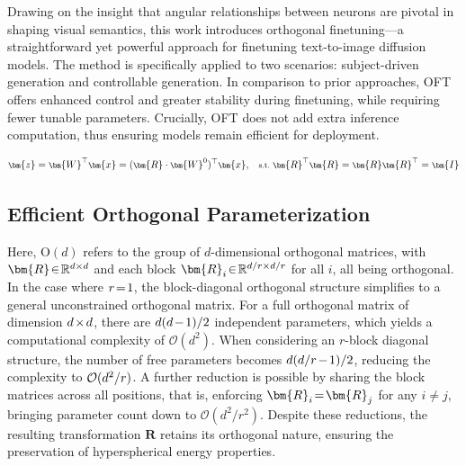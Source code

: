 Drawing on the insight that angular relationships between neurons are pivotal in shaping visual semantics, this work introduces orthogonal finetuning—a straightforward yet powerful approach for finetuning text-to-image diffusion models. The method is specifically applied to two scenarios: subject-driven generation and controllable generation. In comparison to prior approaches, OFT offers enhanced control and greater stability during finetuning, while requiring fewer tunable parameters. Crucially, OFT does not add extra inference computation, thus ensuring models remain efficient for deployment.

\begin{equation}\label{eq:oft_general}
    \footnotesize
    \bm{z}=\bm{W}^\top\bm{x}=(\bm{R}\cdot\bm{W}^0)^\top\bm{x},~~~\text{s.t.}~\bm{R}^\top\bm{R}=\bm{R}\bm{R}^\top=\bm{I}
\end{equation}

\subsection{Efficient Orthogonal Parameterization}\label{sect:eff_ortho}

Here, $\text{O}(d)$ refers to the group of $d$-dimensional orthogonal matrices, with $\thickmuskip=2mu \medmuskip=2mu \bm{R}\in\mathbb{R}^{d\times d}$ and each block $\thickmuskip=2mu \medmuskip=2mu \bm{R}_i\in\mathbb{R}^{d/r\times d/r}$ for all $i$, all being orthogonal. In the case where $\thickmuskip=2mu \medmuskip=2mu r=1$, the block-diagonal orthogonal structure simplifies to a general unconstrained orthogonal matrix. For a full orthogonal matrix of dimension $\thickmuskip=2mu \medmuskip=2mu d\times d$, there are $\thickmuskip=2mu \medmuskip=2mu d(d-1)/2$ independent parameters, which yields a computational complexity of $\mathcal{O}(d^2)$. When considering an $r$-block diagonal structure, the number of free parameters becomes $\thickmuskip=2mu \medmuskip=2mu d(d/r-1)/2$, reducing the complexity to $\thickmuskip=2mu \medmuskip=2mu \mathcal{O}(d^2/r)$. A further reduction is possible by sharing the block matrices across all positions, that is, enforcing $\thickmuskip=2mu \medmuskip=2mu\bm{R}_i=\bm{R}_j$ for any $i\neq j$, bringing parameter count down to $\mathcal{O}(d^2/r^2)$. Despite these reductions, the resulting transformation $\bm{R}$ retains its orthogonal nature, ensuring the preservation of hyperspherical energy properties.

